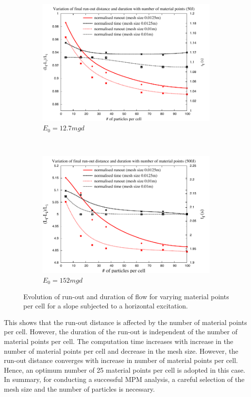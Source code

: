 \begin{figure}[tbhp]
\centering
\begin{subfigure}[b]{0.95\textwidth}
\includegraphics[width=\textwidth]{50}
\caption{$E_0=12.7mgd$}
\label{fig:50}
\end{subfigure}
\\
\begin{subfigure}[b]{0.95\textwidth}
\centering
\includegraphics[width=\textwidth]{500}
\caption{$E_0=152mgd$}
\label{fig:500}
\end{subfigure}
\caption{Evolution of run-out and duration of flow  for varying material points 
per cell for a slope subjected to a horizontal excitation.}
\label{fig:MPM_Size_Effect}
\end{figure}

This shows that the run-out distance is affected by the number of material 
points per cell. However, the duration of the run-out is independent of the 
number of material points per cell. The computation time increases with 
increase in the number of material points per cell and decrease in the mesh 
size. However, the run-out distance converges with increase in number of 
material points per cell. Hence, an optimum number of 25 material points per 
cell is adopted in this case. In summary, for conducting a successful MPM 
analysis, a careful selection of the mesh size and the number of particles is 
necessary.


